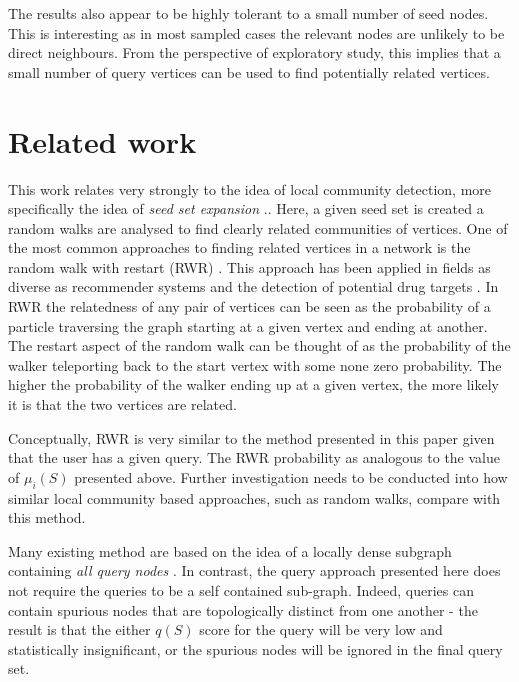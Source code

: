 \documentclass[sigconf]{acmart}
\begin{document}
The results also appear to be highly tolerant to a small number of seed nodes.
This is interesting as in most sampled cases the relevant nodes are unlikely to be direct neighbours.
From the perspective of exploratory study, this implies that a small number of query vertices can be used to find potentially related vertices.

\section{Related work}
\label{sec:related_work}
This work relates very strongly to the idea of local community detection, more specifically the idea of \textit{seed set expansion} \cite{gleich2012vertex}..
Here, a given seed set is created a random walks are analysed to find clearly related communities of vertices.
One of the most common approaches to finding related vertices in a network is the random walk with restart (RWR) \cite{can2005analysis, kohler2008walking}.
This approach has been applied in fields as diverse as recommender systems and the detection of potential drug targets \cite{chen2012drug}.
In RWR the relatedness of any pair of vertices can be seen as the probability of a particle traversing the graph starting at a given vertex and ending at another.
The restart aspect of the random walk can be thought of as the probability of the walker teleporting back to the start vertex with some none zero probability. 
The higher the probability of the walker ending up at a given vertex, the more likely it is that the two vertices are related.

Conceptually, RWR is very similar to the method presented in this paper given that the user has a given query.
The RWR probability as analogous to the value of $\mu_i(S)$ presented above.
Further investigation needs to be conducted into how similar local community based approaches, such as random walks, compare with this method.

Many existing method are based on the idea of a locally dense subgraph containing \textit{all query nodes} \cite{benson2016higher}.
In contrast, the query approach presented here does not require the queries to be a self contained sub-graph.
Indeed, queries can contain spurious nodes that are topologically distinct from one another - the result is that the either $q(S)$ score for the query will be very low and statistically insignificant, or the spurious nodes will be ignored in the final query set.
\end{document}
